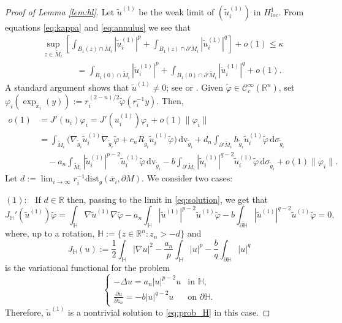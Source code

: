 \documentclass[reqno,11pt,oneside]{amsart}
\numberwithin{equation}{section}
\def\r{\mathbb{R}}
\def\rn{\mathbb{R}^n}
\def\vp{\varphi}
\def\cC{\mathcal{C}}
\def\tilde{\widetilde}
\def\d{\,\mathrm{d}}
\def\dv{\,\mathrm{dv}}
\def\dist{\mathrm{dist}}
\begin{document}
\begin{proof}[Proof of Lemma \ref{lem:hl}]
Let $\tilde{u}^{(1)}$ be the weak limit of $(\tilde{u}_i^{(1)})$ in $H^1_{loc}$. From equations \eqref{eq:kappa} and \eqref{eq:annulus} we see that
\begin{align*}
&\sup_{z\in\tilde{M}_i}\left[\int_{B_1(z)\cap\tilde{M}_i}|\tilde{u}_i^{(1)}|^p + \int_{B_1(z)\cap\partial'\tilde{M}_i}|\tilde{u}_i^{(1)}|^q\right]+o(1)\leq\kappa \\
&\qquad\qquad=\int_{B_1(0)\cap\tilde{M}_i}|\tilde{u}_i^{(1)}|^p + \int_{B_1(0)\cap\partial'\tilde{M}_i}|\tilde{u}_i^{(1)}|^q + o(1).
\end{align*}
A standard argument shows that $\tilde{u}^{(1)}\neq 0$; see \cite[Proof of Lemma A.2]{hl} or \cite[Proof of Lemma 3.2]{dhr}. Given $\tilde{\vp}\in\cC^\infty_c(\rn)$, set $\vp_i(\exp_{\bar{x}_i}(y)):=r_i^{(2-n)/2}\tilde{\vp}(r_i^{-1}y)$. Then,
\begin{align}\label{eq:solution}
o(1)&=J'(u_i)\vp_i=J'(u_i^{(1)})\vp_i + o(1)\|\vp_i\| \nonumber\\
&=\int_{\tilde{M}_i}\Big(\nabla_{\tilde{g}_i}\tilde{u}_i^{(1)}\nabla_{\tilde{g}_i}\tilde{\vp}+c_nR_{\tilde{g}_i}\tilde{u}_i^{(1)}\tilde{\vp}\Big)\dv_{\tilde{g}_i}+d_n\int_{\partial'\tilde{M}_i}h_{\tilde{g}_i}\tilde{u}_i^{(1)}\tilde{\vp}\d\sigma_{\tilde{g}_i}\nonumber \\
&\quad -a_n\int_{\tilde{M}_i}|\tilde{u}_i^{(1)}|^{p-2}\tilde{u}_i^{(1)}\tilde{\vp}\dv_{\tilde{g}_i} - b\int_{\partial'\tilde{M}_i}|\tilde{u}_i^{(1)}|^{q-2}\tilde{u}_i^{(1)}\tilde{\vp}\d\sigma_{\tilde{g}_i} + o(1)\|\vp_i\|.
\end{align}
Let $d:=\lim_{i\to\infty}r_i^{-1}\dist_g(\bar{x}_i,\partial M)$. We consider two cases:

$(1):$ \ If $d\in\r$ then, passing to the limit in \eqref{eq:solution}, we get that
$$J_{\mathbb{H}}'(\tilde{u}^{(1)})\tilde{\vp}=\int_{\mathbb{H}}\nabla\tilde{u}^{(1)}\nabla\tilde{\vp}-a_n\int_{\mathbb{H}}|\tilde{u}^{(1)}|^{p-2}\tilde{u}^{(1)}\tilde{\vp}-b\int_{\partial\mathbb{H}}|\tilde{u}^{(1)}|^{q-2}\tilde{u}^{(1)}\tilde{\vp}=0,$$
where, up to a rotation, $\mathbb{H}:=\{z\in\rn:z_n>-d\}$ and
$$J_{\mathbb{H}}(u):=\frac{1}{2}\int_{\mathbb{H}}|\nabla u|^2-\frac{a_n}{p}\int_{\mathbb{H}}|u|^p-\frac{b}{q}\int_{\partial\mathbb{H}}|u|^q$$ 
is the variational functional for the problem
\begin{equation}\label{eq:prob_H}
\begin{cases}
-\Delta u=a_n|u|^{p-2}u &\text{in \ }\mathbb{H},\\
\frac{\partial u}{\partial z_n}=-b|u|^{q-2}u &\text{on \ }\partial\mathbb{H}.
\end{cases}
\end{equation}
Therefore, $\tilde{u}^{(1)}$ is a nontrivial solution to \eqref{eq:prob_H} in this case. 


\end{proof}
\end{document}
